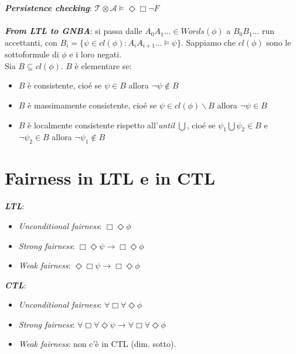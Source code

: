 \documentclass[a4paper, notitlepage, 9pt]{extreport}
\begin{document}
\noindent
\textit{\textbf{Persistence checking}}: $\mathcal{T} \otimes \mathcal{A} \vDash \Diamond \Box \lnot F$\\\\
\textit{\textbf{From LTL to GNBA}}: si passa dalle $A_0 A_1 \dots \in Words(\phi)$ a $B_0 B_1 \dots$ run accettanti, con $B_i = \{\psi \in cl(\phi): A_i A_{i+1}\dots \vDash \psi \}$. Sappiamo che $cl(\phi)$ sono le sottoformule di $\phi$ e i loro negati.\\
Sia $B \subseteq cl(\phi)$. $B$ è elementare se:
\begin{itemize}
	\item $B$ è consistente, cioé se $\psi \in B$ allora $\lnot \psi \notin B$
	\item $B$ è massimamente consistente, cioé se $\psi \in cl(\phi)\backslash B$ allora $\lnot \psi \in B$
	\item $B$ è localmente consistente rispetto all'\textit{until} $\bigcup$, cioé se $\psi_1 \bigcup \psi_2 \in B$ e $\lnot \psi_2 \in B$ allora $\lnot \psi_1 \notin B$
\end{itemize}


\section*{Fairness in LTL e in CTL}
\begin{multicols}{2}
	\noindent
	\textit{\textbf{LTL}}:
	\begin{itemize}
		\item \textit{Unconditional fairness}: $\Box \Diamond \phi$
		\item \textit{Strong fairness}: $\Box \Diamond \psi \rightarrow \Box \Diamond \phi$
		\item \textit{Weak fairness}: $\Diamond \Box \psi \rightarrow \Box \Diamond \phi$
	\end{itemize}
\columnbreak
	\noindent
\textit{\textbf{CTL}}:
	\begin{itemize}
		\item \textit{Unconditional fairness}: $\forall \Box \forall \Diamond \phi$
		\item \textit{Strong fairness}: $\forall \Box \forall \Diamond \psi \rightarrow \forall \Box \forall \Diamond \phi$
		\item \textit{Weak fairness}: non c'è in CTL (dim. sotto).
	\end{itemize}
\end{multicols}
\end{document}

